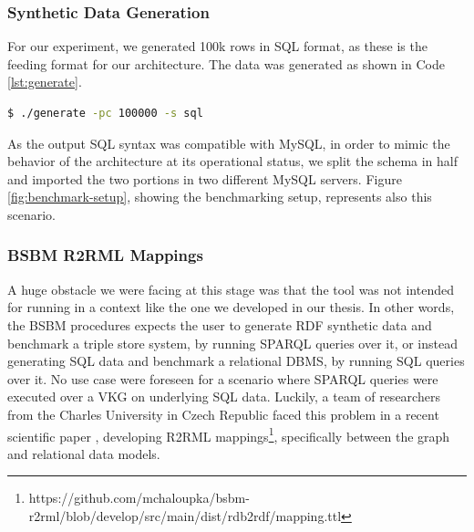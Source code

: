 \subsubsection{Synthetic Data Generation}
For our experiment, we generated 100k rows in \ac{SQL} format, as these is the feeding format for our architecture. The data was generated as shown in Code \ref{lst:generate}.
\begin{lstlisting}[language=bash, caption={BSBM generator script that invokes Generator class and \ac{JAR} executor}, label={lst:generate}]
    $ ./generate -pc 100000 -s sql
\end{lstlisting}
As the output \ac{SQL} syntax was compatible with MySQL, in order to mimic the behavior of the architecture at its operational status, we split the schema in half and imported the two portions in two different MySQL servers. Figure \ref{fig:benchmark-setup}, showing the benchmarking setup, represents also this scenario.

\subsubsection{BSBM R2RML Mappings}
A huge obstacle we were facing at this stage was that the tool was not intended for running in a context like the one we developed in our thesis. In other words, the \ac{BSBM} procedures expects the user to generate \ac{RDF} synthetic data and benchmark a triple store system, by running \ac{SPARQL} queries over it, or instead generating \ac{SQL} data and benchmark a relational \ac{DBMS}, by running \ac{SQL} queries over it. No use case were foreseen for a scenario where \ac{SPARQL} queries were executed over a \ac{VKG} on underlying \ac{SQL} data.
Luckily, a team of researchers from the Charles University in Czech Republic faced this problem in a recent scientific paper \cite{DBLP:journals/dke/ChaloupkaN24}, developing R2RML mappings\footnote{https://github.com/mchaloupka/bsbm-r2rml/blob/develop/src/main/dist/rdb2rdf/mapping.ttl}, specifically between the graph and relational data models.

